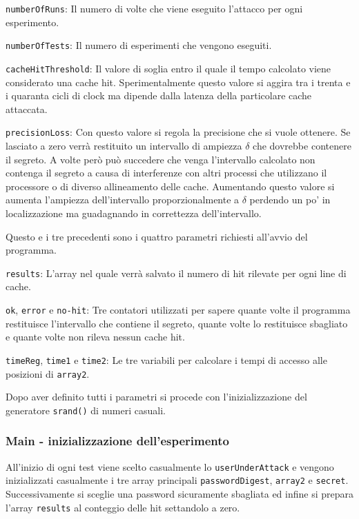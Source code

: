 					\texttt{numberOfRuns}: Il numero di volte che viene eseguito l'attacco per ogni esperimento.
					
					\texttt{numberOfTests}: Il numero di esperimenti che vengono eseguiti.
					
					\texttt{cacheHitThreshold}: Il valore di soglia entro il quale il tempo calcolato viene considerato una cache hit. Sperimentalmente questo valore si aggira tra i trenta e i quaranta cicli di clock ma dipende dalla latenza della particolare cache attaccata.
					
					\texttt{precisionLoss}: Con questo valore si regola la precisione che si vuole ottenere. Se lasciato a zero verrà restituito un intervallo di ampiezza $\delta$ che dovrebbe contenere il segreto. A volte però può succedere che venga l'intervallo calcolato non contenga il segreto a causa di interferenze con altri processi che utilizzano il processore o di diverso allineamento delle cache. Aumentando questo valore si aumenta l'ampiezza dell'intervallo proporzionalmente a $\delta$ perdendo un po' in localizzazione ma guadagnando in correttezza dell'intervallo.
					
					Questo e i tre precedenti sono i quattro parametri richiesti all'avvio del programma.
					
					\texttt{results}: L'array nel quale verrà salvato il numero di hit rilevate per ogni line di cache.
					
					\texttt{ok}, \texttt{error} e \texttt{no-hit}: Tre contatori utilizzati per sapere quante volte il programma restituisce l'intervallo che contiene il segreto, quante volte lo restituisce sbagliato e quante volte non rileva nessun cache hit.
					
					\texttt{timeReg}, \texttt{time1} e \texttt{time2}: Le tre variabili per calcolare i tempi di accesso alle posizioni di \texttt{array2}.
			
				Dopo aver definito tutti i parametri si procede con l'inizializzazione del generatore \texttt{srand()} di numeri casuali.
				
				\subsubsection{Main - inizializzazione dell'esperimento}
				
				All'inizio di ogni test viene scelto casualmente lo \texttt{userUnderAttack} e vengono inizializzati casualmente i tre array principali \texttt{passwordDigest}, \texttt{array2} e \texttt{secret}. Successivamente si sceglie una password sicuramente sbagliata ed infine si prepara l'array \texttt{results} al conteggio delle hit settandolo a zero.
				
